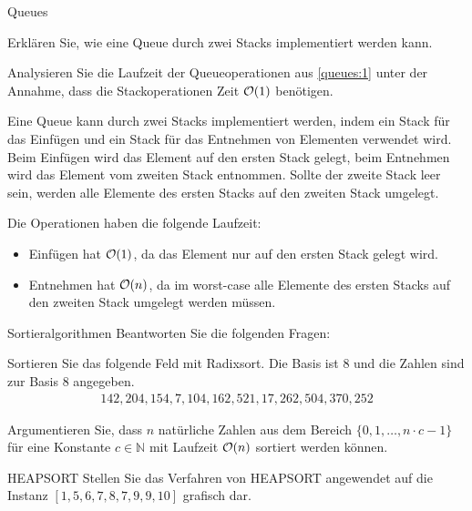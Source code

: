 \documentclass{exercisesheet}
\begin{document}
\begin{exercises}{Queues}
\item\label{queues:1} Erklären Sie, wie eine Queue durch zwei Stacks implementiert werden kann.
\item Analysieren Sie die Laufzeit der Queueoperationen aus \ref{queues:1} unter der Annahme, dass die Stackoperationen Zeit $\mathcal{O}(1)$ benötigen.
\end{exercises}

\begin{solutions}
  \item Eine Queue kann durch zwei Stacks implementiert werden, indem ein Stack für das Einfügen und ein Stack für das Entnehmen von Elementen verwendet wird. Beim Einfügen wird das Element auf den ersten Stack gelegt, beim Entnehmen wird das Element vom zweiten Stack entnommen. Sollte der zweite Stack leer sein, werden alle Elemente des ersten Stacks auf den zweiten Stack umgelegt.
  \item Die Operationen haben die folgende Laufzeit:
  \begin{itemize}
    \item Einfügen hat $\mathcal{O}(1)$, da das Element nur auf den ersten Stack gelegt wird.
    \item Entnehmen hat $\mathcal{O}(n)$, da im worst-case alle Elemente des ersten Stacks auf den zweiten Stack umgelegt werden müssen.
  \end{itemize}
\end{solutions}



\begin{eexercises}{Sortieralgorithmen}{
    Beantworten Sie die folgenden Fragen:
  }
  \item Sortieren Sie das folgende Feld mit Radixsort. Die Basis ist 8 und die Zahlen sind zur Basis 8 angegeben.
  \begin{align*}
    142, 204, 154, 7, 104, 162, 521, 17, 262, 504, 370, 252
  \end{align*}
  \item Argumentieren Sie, dass $n$ natürliche Zahlen aus dem Bereich $\{0, 1, \ldots, n \cdot c - 1\}$ für eine Konstante $c \in \mathbb{N}$ mit Laufzeit $\mathcal{O}(n)$ sortiert werden können.
\end{eexercises}

\begin{exercise}{HEAPSORT}
  Stellen Sie das Verfahren von HEAPSORT angewendet auf die Instanz $[1,5,6,7,8,7,9,9,10]$ grafisch dar.
\end{exercise}
\end{document}
